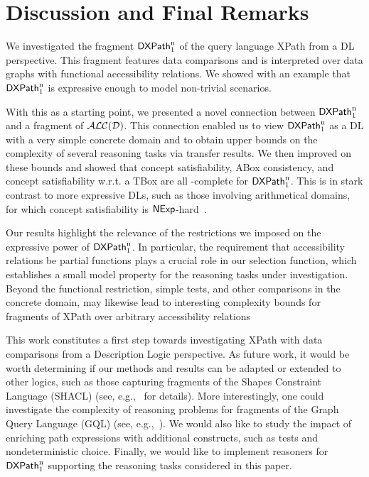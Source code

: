 \section{Discussion and Final Remarks}
\label{sec:final}

We investigated the fragment $\mathsf{DXPath}_{\rm 1}^{\rm n}$ of the query language XPath from a DL perspective. 
This fragment features data comparisons and is interpreted over data graphs with functional accessibility relations. We showed with an example that $\mathsf{DXPath}_{\rm 1}^{\rm n}$ is expressive enough to model non-trivial scenarios.

With this as a starting point, we presented a novel connection between $\mathsf{DXPath}_{\rm 1}^{\rm n}$ and a fragment of $\mathcal{ALC(D)}$. This connection enabled us to view $\mathsf{DXPath}_{\rm 1}^{\rm n}$ as a DL with a very simple concrete domain and to obtain upper bounds on the complexity of several reasoning tasks via transfer results. We then improved on these bounds and showed that concept satisfiability, ABox consistency, and concept satisfiability w.r.t. a TBox are all \np-complete for $\mathsf{DXPath}_{\rm 1}^{\rm n}$. This is in stark contrast to more expressive DLs, such as those involving arithmetical domains, for which concept satisfiability is $\mathsf{NExp}$-hard~\cite{Lutz01,Lutz02b,Lutz02}.

Our results highlight the relevance of the restrictions we imposed on the expressive power of $\mathsf{DXPath}_{\rm 1}^{\rm n}$. In particular, the requirement that accessibility relations be partial functions plays a crucial role in our selection function, which establishes a small model property for the reasoning tasks under investigation.
Beyond the functional restriction, simple tests, and other comparisons in the concrete domain, may likewise lead to interesting complexity bounds for fragments of XPath over arbitrary accessibility relations

This work constitutes a first step towards investigating XPath with data comparisons from a Description Logic perspective. 
As future work, it would be worth determining if our methods and results can be adapted or extended to other logics, such as those capturing fragments of the Shapes Constraint Language (SHACL) (see, e.g.,~\cite{Ortiz23,Ahmetaj0S23} for details). More interestingly, one could investigate the complexity of reasoning problems for fragments of the Graph Query Language (GQL) (see, e.g.,~\cite{FrancisGGLMMMPR23,FrancisGGLMMMPR23b,FigueiraLP26}). We would also like to study the impact of enriching path expressions with additional constructs, such as tests and nondeterministic choice. Finally, we would like to implement reasoners for $\mathsf{DXPath}_{\rm 1}^{\rm n}$ supporting the reasoning tasks considered in this paper. 